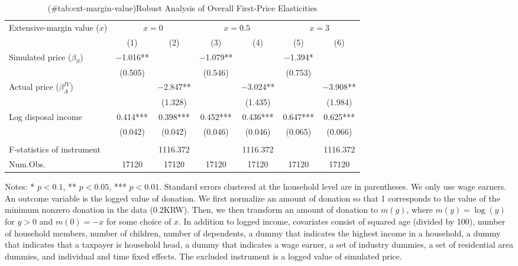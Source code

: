 \begin{table}

\caption{(\#tab:ext-margin-value)Robust Analysis of Overall First-Price Elasticities}
\centering
\fontsize{8}{10}\selectfont
\begin{threeparttable}
\begin{tabular}[t]{lcccccc}
\toprule
\multicolumn{1}{c}{Extensive-margin value ($x$)} & \multicolumn{2}{c}{$x = 0$} & \multicolumn{2}{c}{$x = 0.5$} & \multicolumn{2}{c}{$x = 3$} \\
\cmidrule(l{3pt}r{3pt}){1-1} \cmidrule(l{3pt}r{3pt}){2-3} \cmidrule(l{3pt}r{3pt}){4-5} \cmidrule(l{3pt}r{3pt}){6-7}
  & (1) & (2) & (3) & (4) & (5) & (6)\\
\midrule
Simulated price ($\beta_S$) & \num{-1.016}** &  & \num{-1.079}** &  & \num{-1.394}* & \\
 & (\num{0.505}) &  & (\num{0.546}) &  & (\num{0.753}) & \\
Actual price ($\beta^{IV}_A$) &  & \num{-2.847}** &  & \num{-3.024}** &  & \num{-3.908}**\\
 &  & (\num{1.328}) &  & (\num{1.435}) &  & (\num{1.984})\\
Log disposal income & \num{0.414}*** & \num{0.398}*** & \num{0.452}*** & \num{0.436}*** & \num{0.647}*** & \num{0.625}***\\
 & (\num{0.042}) & (\num{0.042}) & (\num{0.046}) & (\num{0.046}) & (\num{0.065}) & (\num{0.066})\\
\midrule
\addlinespace[0.3em]
\multicolumn{7}{l}{\textit{1st stage information (Excluded instrument: Simulated price)}}\\
\hspace{1em}F-statistics of instrument &  & \num{1116.372} &  & \num{1116.372} &  & \num{1116.372}\\
Num.Obs. & \num{17120} & \num{17120} & \num{17120} & \num{17120} & \num{17120} & \num{17120}\\
\bottomrule
\end{tabular}
\begin{tablenotes}
\item Notes: * $p < 0.1$, ** $p < 0.05$, *** $p < 0.01$. Standard errors clustered at the household level are in parentheses. We only use wage earners. An outcome variable is the logged value of donation. We first normalize an amount of donation so that 1 corresponds to the value of the minimum nonzero donation in the data ($0.2$KRW). Then, we then transform an amount of donation to $m(g)$, where $m(y) = \log(y)$ for $y > 0$ and $m(0) = -x$ for some choice of $x$. In addition to logged income, covariates consist of squared age (divided by 100), number of household members, number of children, number of dependents, a dummy that indicates the highest income in a household, a dummy that indicates that a taxpayer is household head, a dummy that indicates a wage earner, a set of industry dummies, a set of residential area dummies, and individual and time fixed effects. The excluded instrument is a logged value of simulated price.
\end{tablenotes}
\end{threeparttable}
\end{table}
